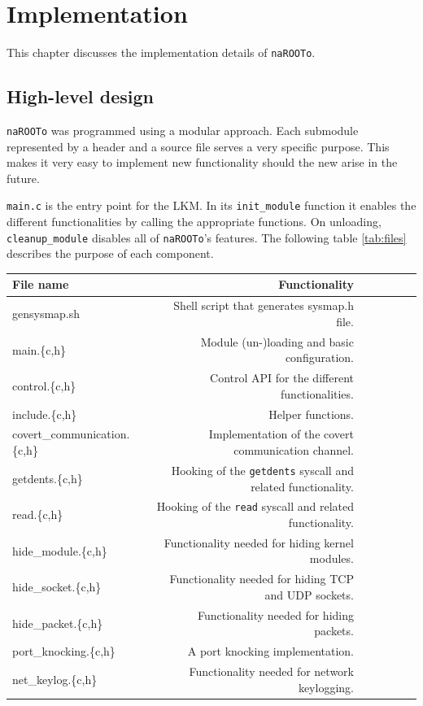 \documentclass[10pt, letterpaper]{scrartcl}
\begin{document}
\section{Implementation}
This chapter discusses the implementation details of \texttt{naROOTo}. 

\subsection{High-level design}
\texttt{naROOTo} was programmed using a modular approach. Each submodule represented by a header and a source file serves a very specific purpose.
This makes it very easy to implement new functionality should the new arise in the future.

\texttt{main.c} is the entry point for the LKM. In its \texttt{init\_module} function it enables the different functionalities by calling the appropriate functions. On unloading, \texttt{cleanup\_module} disables all of \texttt{naROOTo}'s features.
The following table \ref{tab:files} describes the purpose of each component. \\



\begin{tabular}{l*{6}r}
File name             & Functionality \\
\hline
gensysmap.sh & Shell script that generates sysmap.h file.\\
main.\{c,h\} & Module (un-)loading and basic configuration.\\
control.\{c,h\} & Control API for the different functionalities.\\
include.\{c,h\} & Helper functions.\\
covert\_communication.\{c,h\} & Implementation of the covert communication channel.\\
getdents.\{c,h\} & Hooking of the \texttt{getdents} syscall and related functionality.\\
read.\{c,h\} & Hooking of the \texttt{read} syscall and related functionality.\\
hide\_module.\{c,h\} & Functionality needed for hiding kernel modules.\\
hide\_socket.\{c,h\} & Functionality needed for hiding TCP and UDP sockets.\\
hide\_packet.\{c,h\} & Functionality needed for hiding packets. \\
port\_knocking.\{c,h\} & A port knocking implementation.\\
net\_keylog.\{c,h\} & Functionality needed for network keylogging.\\

\end{tabular}
\end{document}
